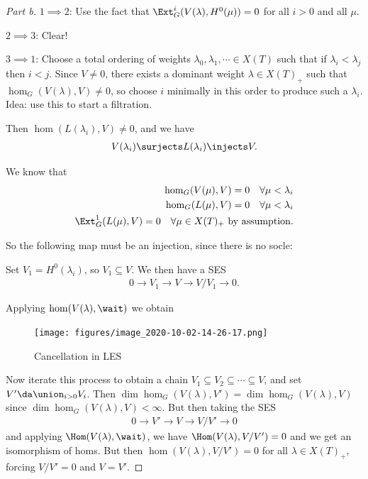 \begin{proof}[Part b]

\(1\implies 2\): Use the fact that
\(\Ext^i_G(V(\lambda), H^0(\mu)) = 0\) for all \(i>0\) and all \(\mu\).

\(2\implies 3\): Clear!

\(3\implies 1\): Choose a total ordering of weights
\(\lambda_0, \lambda_1, \cdots \in X(T)\) such that if
\(\lambda_i < \lambda_j\) then \(i<j\). Since \(V\neq 0\), there exists
a dominant weight \(\lambda \in X(T)_+\) such that
\(\hom_G(V(\lambda), V) \neq 0\), so choose \(i\) minimally in this
order to produce such a \(\lambda_i\). Idea: use this to start a
filtration.

Then \(\hom(L(\lambda_i), V) \neq 0\), and we have
\begin{align*}  
V(\lambda_i) \surjects L(\lambda_i) \injects V
.\end{align*}

We know that
\begin{align*}  
\hom_G(V(\mu), V) = 0 \quad \forall \mu < \lambda_i \\
\hom_G(L(\mu), V) = 0 \quad \forall \mu < \lambda_i \\
\Ext_G^1(L(\mu), V) = 0 \quad \forall \mu \in X(T)_+ \text{ by assumption}
.\end{align*}

So the following map must be an injection, since there is no socle:

\begin{center}
\end{center}

Set \(V_1 = H^0(\lambda_i)\), so \(V_1 \subseteq V\). We then have a SES
\begin{align*}  
0 \to V_1 \to V \to V/V_1 \to 0 
.\end{align*}

Applying \(\hom(V(\lambda), \wait)\) we obtain

\begin{figure}
\centering
\texttt{[image: figures/image\_2020-10-02-14-26-17.png]}
\caption{Cancellation in LES}
\end{figure}

Now iterate this process to obtain a chain
\(V_1 \subseteq V_2 \subseteq \cdots \subseteq V\), and set
\(V' \da \union_{i>0} V_i\). Then
\(\dim \hom_G(V(\lambda), V') = \dim \hom_G( V(\lambda), V )\) since
\(\dim \hom_G(V(\lambda), V) < \infty\). But then taking the SES
\begin{align*}  
0\to V' \to V \to V/V' \to 0
\end{align*} and applying \(\Hom(V(\lambda), \wait)\), we have
\(\Hom(V(\lambda), V/V') = 0\) and we get an isomorphism of homs. But
then \(\hom(V(\lambda), V/V') = 0\) for all \(\lambda \in X(T)_+\),
forcing \(V/V'=0\) and \(V=V'\).

\end{proof}

